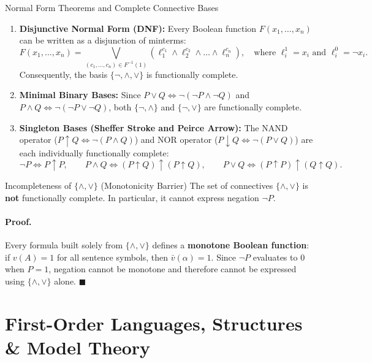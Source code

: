 \begin{theorembox}{Normal Form Theorems and Complete Connective Bases}
\begin{enumerate}[leftmargin=1.4em,itemsep=3pt]
  \item \textbf{Disjunctive Normal Form (DNF):} Every Boolean function $F(x_1, \dots, x_n)$ can be written as a disjunction of minterms:
  \[
  F(x_1, \dots, x_n) = \bigvee_{(c_1, \dots, c_n) \in F^{-1}(1)} \left( \ell_1^{c_1} \land \ell_2^{c_2} \land \dots \land \ell_n^{c_n} \right), \quad \text{where } \ell_i^1 = x_i \text{ and } \ell_i^0 = \neg x_i.
  \]
  Consequently, the basis $\{\neg, \land, \lor\}$ is functionally complete.
  \item \textbf{Minimal Binary Bases:} Since $P \lor Q \iff \neg(\neg P \land \neg Q)$ and $P \land Q \iff \neg(\neg P \lor \neg Q)$, both $\{\neg, \land\}$ and $\{\neg, \lor\}$ are functionally complete.
  \item \textbf{Singleton Bases (Sheffer Stroke and Peirce Arrow):} The NAND operator ($P \uparrow Q \iff \neg(P \land Q)$) and NOR operator ($P \downarrow Q \iff \neg(P \lor Q)$) are each individually functionally complete:
  \[
  \neg P \iff P \uparrow P, \qquad P \land Q \iff (P \uparrow Q) \uparrow (P \uparrow Q), \qquad P \lor Q \iff (P \uparrow P) \uparrow (Q \uparrow Q).
  \]
\end{enumerate}
\end{theorembox}

\begin{propbox}{Incompleteness of $\{\land, \lor\}$ (Monotonicity Barrier)}
The set of connectives $\{\land, \lor\}$ is \textbf{not} functionally complete. In particular, it cannot express negation $\neg P$.
\end{propbox}
\paragraph{Proof.}
Every formula built solely from $\{\land, \lor\}$ defines a \textbf{monotone Boolean function}: if $v(A) = 1$ for all sentence symbols, then $\bar{v}(\alpha) = 1$. Since $\neg P$ evaluates to $0$ when $P = 1$, negation cannot be monotone and therefore cannot be expressed using $\{\land, \lor\}$ alone. $\blacksquare$

\section{First-Order Languages, Structures \& Model Theory}
\label{sec:first_order_model_theory}

